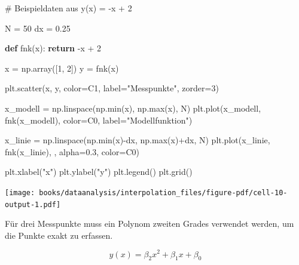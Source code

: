 \documentclass[
  letterpaper,
  DIV=11,
  numbers=noendperiod]{scrreprt}
\newenvironment{Shaded}{\begin{snugshade}}{\end{snugshade}}
\newcommand{\BuiltInTok}[1]{\textcolor[rgb]{0.00,0.23,0.31}{#1}}
\newcommand{\CommentTok}[1]{\textcolor[rgb]{0.37,0.37,0.37}{#1}}
\newcommand{\ControlFlowTok}[1]{\textcolor[rgb]{0.00,0.23,0.31}{\textbf{#1}}}
\newcommand{\DecValTok}[1]{\textcolor[rgb]{0.68,0.00,0.00}{#1}}
\newcommand{\FloatTok}[1]{\textcolor[rgb]{0.68,0.00,0.00}{#1}}
\newcommand{\KeywordTok}[1]{\textcolor[rgb]{0.00,0.23,0.31}{\textbf{#1}}}
\newcommand{\NormalTok}[1]{\textcolor[rgb]{0.00,0.23,0.31}{#1}}
\newcommand{\OperatorTok}[1]{\textcolor[rgb]{0.37,0.37,0.37}{#1}}
\newcommand{\StringTok}[1]{\textcolor[rgb]{0.13,0.47,0.30}{#1}}
\begin{document}
\begin{Shaded}
\begin{Highlighting}[]
\CommentTok{\# Beispieldaten aus y(x) = {-}x + 2}

\NormalTok{N }\OperatorTok{=} \DecValTok{50}
\NormalTok{dx }\OperatorTok{=} \FloatTok{0.25}

\KeywordTok{def}\NormalTok{ fnk(x):}
    \ControlFlowTok{return} \OperatorTok{{-}}\NormalTok{x }\OperatorTok{+} \DecValTok{2}

\NormalTok{x }\OperatorTok{=}\NormalTok{ np.array([}\DecValTok{1}\NormalTok{, }\DecValTok{2}\NormalTok{])}
\NormalTok{y }\OperatorTok{=}\NormalTok{ fnk(x)}

\NormalTok{plt.scatter(x, y, color}\OperatorTok{=}\StringTok{\textquotesingle{}C1\textquotesingle{}}\NormalTok{, label}\OperatorTok{=}\StringTok{"Messpunkte"}\NormalTok{, zorder}\OperatorTok{=}\DecValTok{3}\NormalTok{)}

\NormalTok{x\_modell }\OperatorTok{=}\NormalTok{ np.linspace(np.}\BuiltInTok{min}\NormalTok{(x), np.}\BuiltInTok{max}\NormalTok{(x), N)}
\NormalTok{plt.plot(x\_modell, fnk(x\_modell), color}\OperatorTok{=}\StringTok{\textquotesingle{}C0\textquotesingle{}}\NormalTok{, label}\OperatorTok{=}\StringTok{"Modellfunktion"}\NormalTok{)}

\NormalTok{x\_linie }\OperatorTok{=}\NormalTok{ np.linspace(np.}\BuiltInTok{min}\NormalTok{(x)}\OperatorTok{{-}}\NormalTok{dx, np.}\BuiltInTok{max}\NormalTok{(x)}\OperatorTok{+}\NormalTok{dx, N)}
\NormalTok{plt.plot(x\_linie, fnk(x\_linie), }\StringTok{\textquotesingle{}{-}{-}\textquotesingle{}}\NormalTok{, alpha}\OperatorTok{=}\FloatTok{0.3}\NormalTok{, color}\OperatorTok{=}\StringTok{\textquotesingle{}C0\textquotesingle{}}\NormalTok{)}

\NormalTok{plt.xlabel(}\StringTok{"x"}\NormalTok{)}
\NormalTok{plt.ylabel(}\StringTok{"y"}\NormalTok{)}
\NormalTok{plt.legend()}
\NormalTok{plt.grid()}
\end{Highlighting}
\end{Shaded}

\texttt{[image: books/dataanalysis/interpolation\_files/figure-pdf/cell-10-output-1.pdf]}

Für drei Messpunkte muss ein Polynom zweiten Grades verwendet werden, um
die Punkte exakt zu erfassen.

\[y(x) = \beta_2 x^2 + \beta_1 x + \beta_0\]
\end{document}
